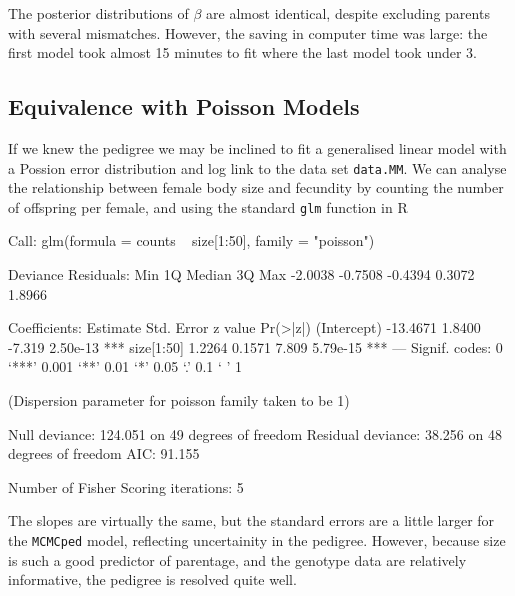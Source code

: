 \documentclass{article}
\begin{document}
The posterior distributions of $\beta$ are almost identical, despite excluding parents with several mismatches. However, the saving in computer time was large: the first model took almost 15 minutes to fit where the last model took under 3. 

\subsection{Equivalence with Poisson Models}

 If we knew the pedigree we may be inclined to fit a generalised linear model with a Possion error distribution and log link to the data set \texttt{data.MM}.  We can analyse the relationship between female body size and fecundity by counting the number of offspring per female, and using the standard \texttt{glm} function in R 

\begin{Schunk}
\begin{Soutput}
Call:
glm(formula = counts ~ size[1:50], family = "poisson")

Deviance Residuals: 
    Min       1Q   Median       3Q      Max  
-2.0038  -0.7508  -0.4394   0.3072   1.8966  

Coefficients:
            Estimate Std. Error z value Pr(>|z|)    
(Intercept) -13.4671     1.8400  -7.319 2.50e-13 ***
size[1:50]    1.2264     0.1571   7.809 5.79e-15 ***
---
Signif. codes:  0 ‘***’ 0.001 ‘**’ 0.01 ‘*’ 0.05 ‘.’ 0.1 ‘ ’ 1 

(Dispersion parameter for poisson family taken to be 1)

    Null deviance: 124.051  on 49  degrees of freedom
Residual deviance:  38.256  on 48  degrees of freedom
AIC: 91.155

Number of Fisher Scoring iterations: 5
\end{Soutput}
\end{Schunk}

The slopes are virtually the same,  but the standard errors are a little larger for the \texttt{MCMCped} model, reflecting uncertainity in the pedigree.  However, because size is such a good predictor of parentage, and the genotype data are relatively informative, the pedigree is resolved quite well.
\end{document}
